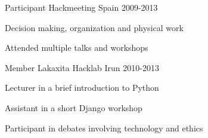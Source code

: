 

\begin{cventries}

  \cventry
    {Participant} %
    {Hackmeeting} %
    {Spain} %
    {2009-2013} %
    {
      \begin{cvitems} %
        \item {Decision making, organization and physical work}
        \item {Attended multiple talks and workshops}
      \end{cvitems}
    }

  \cventry
    {Member} %
    {Lakaxita Hacklab} %
    {Irun} %
    {2010-2013} %
    {
      \begin{cvitems} %
        \item {Lecturer in a brief introduction to Python}
        \item {Assistant in a short Django workshop}
        \item {Participant in debates involving technology and ethics}
      \end{cvitems}
    }

\end{cventries}
